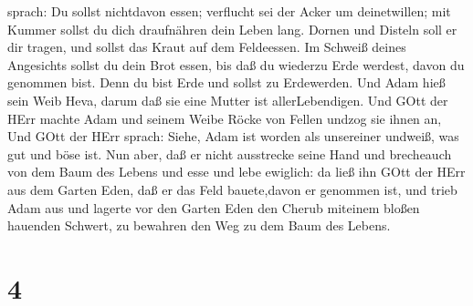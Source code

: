 sprach: Du sollst nichtdavon essen; verflucht sei der Acker um
deinetwillen; mit Kummer sollst du dich draufnähren dein Leben lang.
 Dornen und Disteln soll er dir tragen, und sollst das
Kraut auf dem Feldeessen.  Im Schweiß deines Angesichts
sollst du dein Brot essen, bis daß du wiederzu Erde werdest, davon du
genommen bist. Denn du bist Erde und sollst zu Erdewerden. 
Und Adam hieß sein Weib Heva, darum daß sie eine Mutter ist
allerLebendigen.  Und GOtt der HErr machte Adam und seinem
Weibe Röcke von Fellen undzog sie ihnen an,  Und GOtt der
HErr sprach: Siehe, Adam ist worden als unsereiner undweiß, was gut und
böse ist. Nun aber, daß er nicht ausstrecke seine Hand und brecheauch
von dem Baum des Lebens und esse und lebe ewiglich:  da
ließ ihn GOtt der HErr aus dem Garten Eden, daß er das Feld bauete,davon
er genommen ist,  und trieb Adam aus und lagerte vor den
Garten Eden den Cherub miteinem bloßen hauenden Schwert, zu bewahren den
Weg zu dem Baum des Lebens.

\hypertarget{section-3}{%
\section{4}\label{section-3}}

